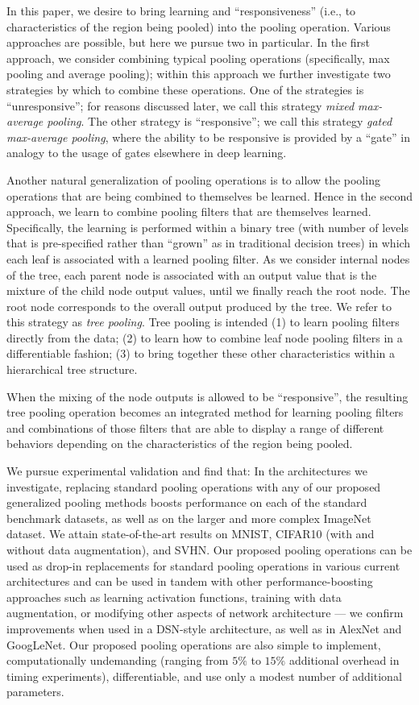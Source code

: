 \documentclass[twoside]{article}
\begin{document}
In this paper, we desire to bring learning and ``responsiveness'' (i.e., to characteristics 
of the region being pooled) into the pooling operation. 
Various approaches are possible, but here we pursue two in particular. 
In the first approach, we consider combining typical pooling operations (specifically,
max pooling and average pooling); within this approach we further investigate 
two strategies by which to combine these operations. One of the strategies is
``unresponsive''; for reasons discussed later, we call this strategy 
\emph{mixed max-average pooling}. The other strategy is ``responsive''; we call 
this  strategy \emph{gated max-average pooling}, where the ability to be responsive 
is provided by a ``gate'' in analogy to the usage of gates elsewhere in deep learning.

Another natural generalization of pooling operations is to allow the pooling operations 
that are being combined to themselves be learned. Hence in the second approach, we 
learn to combine pooling filters that are themselves learned. Specifically,
the learning is performed within a binary tree (with number of levels that is 
pre-specified rather than ``grown'' as in traditional decision trees) in which each 
leaf is associated with a learned pooling filter. As we consider internal nodes 
of the tree, each parent node is associated with an output value that is the mixture 
of the child node output values, until we finally reach the root node. The root
node corresponds to the overall output produced by the tree. We refer to this strategy as \emph{tree 
pooling}. Tree pooling is intended (1) to learn pooling filters directly from the data;
(2) to learn how to combine leaf node pooling filters in a differentiable fashion; 
(3) to bring together these other characteristics within a hierarchical tree structure.

When the mixing of the node outputs is allowed to be ``responsive'',
the resulting tree pooling operation becomes an integrated method for learning pooling 
filters and combinations of those filters that are able to display a range of different behaviors 
depending on the characteristics of the region being pooled.

We pursue experimental validation and find that: In the architectures we investigate, 
replacing standard pooling operations with any of our proposed generalized pooling methods 
boosts performance on each of the standard benchmark datasets, as well as on the larger and 
more complex ImageNet dataset. We attain state-of-the-art results
on MNIST, CIFAR10 (with and without data augmentation), and SVHN. Our proposed pooling operations 
can be used as drop-in replacements for standard pooling operations in various current architectures 
and can be used in tandem with other performance-boosting approaches such as learning activation 
functions, training with data augmentation, or modifying other aspects of network architecture --- 
we confirm improvements when used in a DSN-style architecture, as well as in AlexNet and GoogLeNet. 
Our proposed pooling operations are also simple to implement, computationally undemanding (ranging from $5\%$ 
to $15\%$ additional overhead in timing experiments), differentiable, and use 
only a modest number of additional parameters.
\vspace{-4mm}
\end{document}
